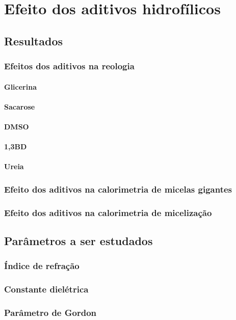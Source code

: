 \part{Efeito dos aditivos hidrofílicos}
	\chapter{Resultados}
		\section{Efeitos dos aditivos na reologia}
			\subsection{Glicerina}
			\subsection{Sacarose}
			\subsection{DMSO}
			\subsection{1,3BD}
			\subsection{Ureia}
		\section{Efeito dos aditivos na calorimetria de micelas gigantes}
		\section{Efeito dos aditivos na calorimetria de micelização}
	\chapter{Parâmetros a ser estudados}
		\section{Índice de refração}
		\section{Constante dielétrica}
		\section{Parâmetro de Gordon}

